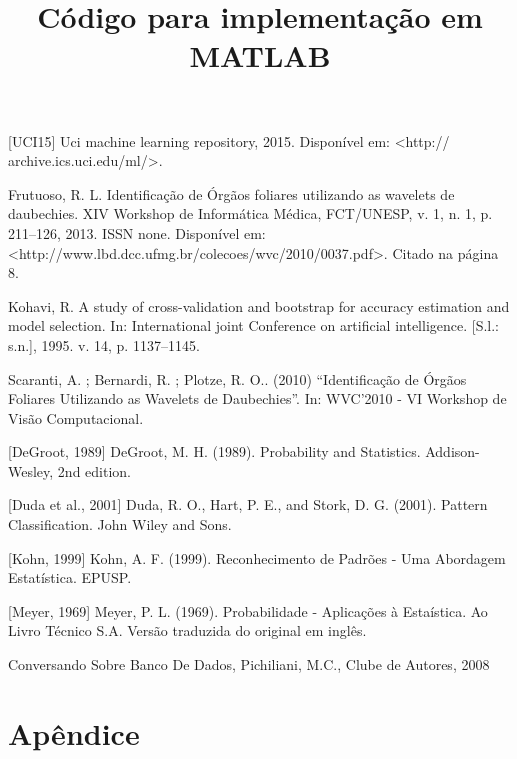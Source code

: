 \documentclass[a4paper]{article}
\begin{document}
\begin{thebibliography}{1}

[UCI15] Uci machine learning repository, 2015. Disponível em: <http:// archive.ics.uci.edu/ml/>.

Frutuoso, R. L. Identificação de Órgãos foliares utilizando as wavelets de daubechies. XIV Workshop de Informática Médica, FCT/UNESP, v. 1, n. 1, p. 211–126, 2013. ISSN none. Disponível em: <http://www.lbd.dcc.ufmg.br/colecoes/wvc/2010/0037.pdf>. Citado na página 8.

Kohavi, R. A study of cross-validation and bootstrap for accuracy estimation and model selection. In: International joint Conference on artificial intelligence. [S.l.: s.n.], 1995. v. 14, p. 1137–1145.

Scaranti, A. ; Bernardi, R. ; Plotze, R. O.. (2010) “Identificação de Órgãos Foliares Utilizando as Wavelets de Daubechies”. In: WVC'2010 - VI Workshop de Visão Computacional.

[DeGroot, 1989] DeGroot, M. H. (1989). Probability and Statistics. Addison-Wesley, 2nd edition.

[Duda et al., 2001] Duda, R. O., Hart, P. E., and Stork, D. G. (2001). Pattern Classification. John Wiley and Sons.

[Kohn, 1999] Kohn, A. F. (1999). Reconhecimento de Padrões - Uma Abordagem Estatística. EPUSP.

[Meyer, 1969] Meyer, P. L. (1969). Probabilidade - Aplicações à Estaística. Ao Livro Técnico S.A. Versão traduzida do original em inglês.


  {Conversando Sobre Banco De Dados},
  {Pichiliani, M.C.},
  {Clube de Autores},
  {2008}


\end{thebibliography}


\newpage
\appendix
\section{Apêndice}

\title{\textbf{Código para implementação em MATLAB}}


\begin{description}
\item[] 
\end{description}
\end{document}
